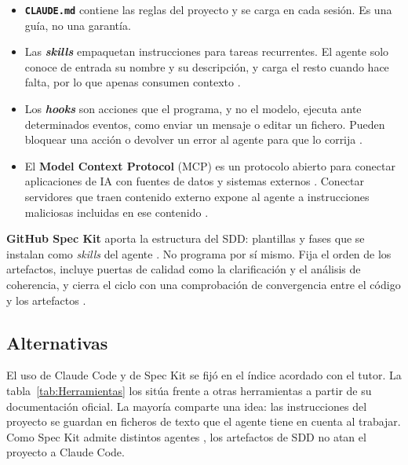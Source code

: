 \begin{itemize}
	\item \textbf{\texttt{CLAUDE.md}} contiene las reglas del proyecto y se carga en cada sesión. Es una guía, no una garantía.
	\item Las \textbf{\emph{skills}} empaquetan instrucciones para tareas recurrentes. El agente solo conoce de entrada su nombre y su descripción, y carga el resto cuando hace falta, por lo que apenas consumen contexto \citep{anthropic2026skills}.
	\item Los \textbf{\emph{hooks}} son acciones que el programa, y no el modelo, ejecuta ante determinados eventos, como enviar un mensaje o editar un fichero. Pueden bloquear una acción o devolver un error al agente para que lo corrija \citep{anthropic2026hooks}.
	\item El \textbf{Model Context Protocol} (MCP) es un protocolo abierto para conectar aplicaciones de IA con fuentes de datos y sistemas externos \citep{anthropic2024mcp,anthropic2026mcpdocs}. Conectar servidores que traen contenido externo expone al agente a instrucciones maliciosas incluidas en ese contenido \citep{anthropic2026mcpdocs}.
\end{itemize}

\textbf{GitHub Spec Kit} aporta la estructura del SDD: plantillas y fases que se instalan como \emph{skills} del agente \citep{github2026speckit,github2026speckitintegrations}. No programa por sí mismo. Fija el orden de los artefactos, incluye puertas de calidad como la clarificación y el análisis de coherencia, y cierra el ciclo con una comprobación de convergencia entre el código y los artefactos \citep{github2026speckitquickstart}.

\subsection{Alternativas}\label{subsec:AlternativasHerramientas}

El uso de Claude Code y de Spec Kit se fijó en el índice acordado con el tutor. La tabla~\ref{tab:Herramientas} los sitúa frente a otras herramientas a partir de su documentación oficial. La mayoría comparte una idea: las instrucciones del proyecto se guardan en ficheros de texto que el agente tiene en cuenta al trabajar. Como Spec Kit admite distintos agentes \citep{github2026speckitintegrations}, los artefactos de SDD no atan el proyecto a Claude Code.

